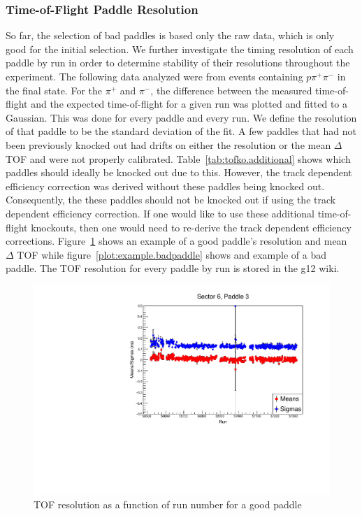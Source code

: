 \begin{v2}
\subsubsection{\label{sec:calib.tof.resolution}Time-of-Flight Paddle Resolution}
So far, the selection of bad paddles is based only the raw data, which is only good for the initial selection. We further investigate the timing resolution of each paddle by run in order to determine stability of their resolutions throughout the experiment. The following data analyzed were from events containing $p \pi^{+} \pi^{-}$ in the final state. For the $\pi^{+}$ and $\pi^{-}$, the difference between the measured time-of-flight and the expected time-of-flight for a given run was plotted and fitted to a Gaussian. This was done for every paddle and every run. We define the resolution of that paddle to be the standard deviation of the fit. 
A few paddles that had not been previously knocked out had drifts on either the resolution or the mean $\Delta$ TOF and were not properly calibrated. Table~\ref{tab:tofko.additional} shows which paddles should ideally be knocked out due to this. However, the track dependent efficiency correction was derived without these paddles being knocked out. Consequently, the these paddles should not be knocked out if using the track dependent efficiency correction. If one would like to use these additional time-of-flight knockouts, then one would need to re-derive the track dependent efficiency corrections. Figure~\ref{plot:example.goodpaddle} shows an example of a good paddle's resolution and mean $\Delta$ TOF while figure~\ref{plot:example.badpaddle} shows and example of a bad paddle. The TOF resolution for every paddle by run is stored in the g12 wiki.


\begin{figure}\begin{center}
      \includegraphics[width=0.95\columnwidth]{figures/calib/tof/goodexample.pdf}
   \caption{\label{plot:example.goodpaddle}TOF resolution as a function of run number for a good paddle}
\end{center}\end{figure}


\end{v2}

